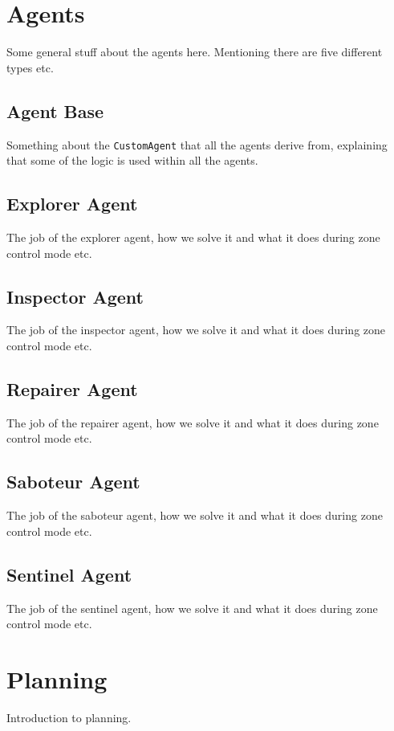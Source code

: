 \documentclass[11pt]{article}
\begin{document}
\section{Agents}
Some general stuff about the agents here. Mentioning there are five different types etc.

\subsection{Agent Base}
Something about the {\tt CustomAgent} that all the agents derive from, explaining that some of the logic is used within all the agents.

\subsection{Explorer Agent}
The job of the explorer agent, how we solve it and what it does during zone control mode etc.

\subsection{Inspector Agent}
The job of the inspector agent, how we solve it and what it does during zone control mode etc.

\subsection{Repairer Agent}
The job of the repairer agent, how we solve it and what it does during zone control mode etc.

\subsection{Saboteur Agent}
The job of the saboteur agent, how we solve it and what it does during zone control mode etc.

\subsection{Sentinel Agent}
The job of the sentinel agent, how we solve it and what it does during zone control mode etc.

\section{Planning}
Introduction to planning.
\end{document}
